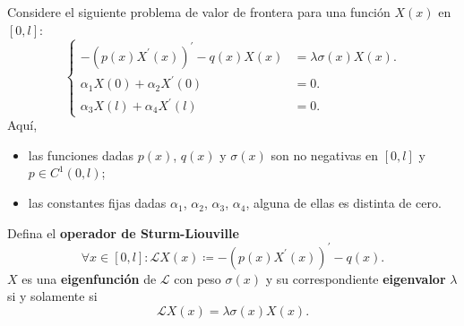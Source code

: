 \begin{definition}
    Considere el siguiente problema de valor de frontera para una
    función $X\left(x\right)$ en $\left[0,l\right]$:
    \begin{equation*}
        \left\{
        \begin{aligned}
            -{\left(
            p\left(x\right)
            X^{\prime}\left(x\right)
            \right)}^{\prime}-
            q\left(x\right)
            X\left(x\right)                    & =
            \lambda
            \sigma\left(x\right)
            X\left(x\right).                       \\
            \alpha_{1}X\left(0\right)+
            \alpha_{2}X^{\prime}\left(0\right) & =
            0.                                     \\
            \alpha_{3}X\left(l\right)+
            \alpha_{4}X^{\prime}\left(l\right) & =
            0.
        \end{aligned}
        \right.
    \end{equation*}
    Aquí,
    \begin{itemize}
        \item

              las funciones dadas $p\left(x\right)$,
              $q\left(x\right)$ y $\sigma\left(x\right)$ son no
              negativas en $\left[0,l\right]$ y
              $p\in C^{1}\left(0,l\right)$;

        \item

              las constantes fijas dadas $\alpha_{1}$, $\alpha_{2}$,
              $\alpha_{3}$, $\alpha_{4}$, alguna de ellas es distinta
              de cero.
    \end{itemize}
\end{definition}

\begin{definition}
    Defina el \textbf{operador de Sturm-Liouville}
    \begin{equation*}
        \forall x\in\left[0,l\right]:
        \mathcal{L}
        X\left(x\right)\coloneqq
        -{\left(
        p\left(x\right)
        X^{\prime}\left(x\right)
        \right)}^{\prime}-
        q\left(x\right).
    \end{equation*}
    $X$ es una \textbf{eigenfunción} de $\mathcal{L}$ con peso
    $\sigma\left(x\right)$ y su correspondiente \textbf{eigenvalor}
    $\lambda$ si y solamente si
    \begin{equation*}
        \mathcal{L}
        X\left(x\right)=
        \lambda
        \sigma\left(x\right)
        X\left(x\right).
    \end{equation*}
\end{definition}

